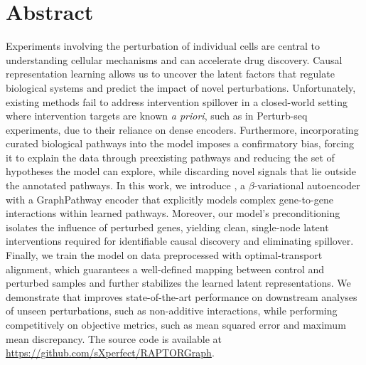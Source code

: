 \documentclass[10pt,letterpaper]{article}
\theoremstyle{definition}
\theoremstyle{remark}
\newcommand{\apriori}{\emph{a priori}}
\begin{document}
\section*{Abstract}
Experiments involving the perturbation of individual cells are central to understanding cellular mechanisms and can accelerate drug discovery.
Causal representation learning allows us to uncover the latent factors that regulate biological systems and predict the impact of novel perturbations. Unfortunately, existing methods fail to address intervention spillover in a closed-world setting where intervention targets are known \apriori, such as in Perturb-seq experiments, due to their reliance on dense encoders.
Furthermore, incorporating curated biological pathways into the model imposes a confirmatory bias, forcing it to explain the data through preexisting pathways and reducing the set of hypotheses the model can explore, while discarding novel signals that lie outside the annotated pathways.
In this work, we introduce , a $\beta$-variational autoencoder with a GraphPathway encoder that explicitly models complex gene-to-gene interactions within learned pathways.
Moreover, our model's preconditioning isolates the influence of perturbed genes, yielding clean, single-node latent interventions required for identifiable causal discovery and eliminating spillover.
Finally, we train the model on data preprocessed with optimal-transport alignment, which guarantees a well-defined mapping between control and perturbed samples and further stabilizes the learned latent representations.
We demonstrate that  improves state-of-the-art performance on downstream analyses of unseen perturbations, such as non-additive interactions, while performing competitively on objective metrics, such as mean squared error and maximum mean discrepancy.
The source code is available at \url{https://github.com/sXperfect/RAPTORGraph}.

\end{document}
